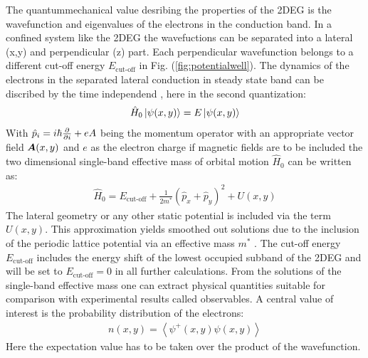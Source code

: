 The quantummechanical value desribing the properties of the 2DEG is the wavefunction and eigenvalues of the electrons in the conduction band. In a confined system like the 2DEG the wavefuctions can be separated into a lateral (x,y) and perpendicular (z) part. Each perpendicular wavefunction belongs to a different cut-off energy $E_{\text{cut-off}}$ in Fig. (\ref{fig:potentialwell}).
The dynamics of the electrons in the separated lateral conduction in steady state band can be discribed by the time independend \sdg{}, here in the second quantization:
\begin{align}
 \hat{H}_0\left| \psi(x,y) \right> = E \left| \psi(x,y) \right>
	\label{eqn:effectivemasssdg}
\end{align}
With $\hat{p}_i = i\hbar \frac{\partial }{\partial i} + eA$ being the momentum operator with an appropriate vector field $\boldsymbol{A}(x,y)$ and $e$ as the electron charge if magnetic fields are to be included the two dimensional single-band effective mass \hamil{} of orbital motion $\hat{H}_0$ can be written as:
\begin{align}
\hat{H}_0 = E_{\text{cut-off}} + \frac{1}{2m^*}(\hat{p}_{x}+\hat{p}_{y})^2+U(x,y)
\end{align}
The lateral geometry or any other static potential is included via the term $U(x,y)$.
This approximation yields smoothed out solutions due to the inclusion of the periodic lattice potential via an effective mass $m^*$ \cite{BastardBrum1986}.
The cut-off energy $E_{\text{cut-off}}$ includes the energy shift of the lowest occupied subband of the 2DEG and will be set to $E_{\text{cut-off}} = 0$ in all further calculations.
From the solutions of the single-band effective mass \sdg{} one can extract physical quantities suitable for comparison with experimental results called observables.
A central value of interest is the probability distribution of the electrons:
\begin{align}
	n(x,y) = \left< \psi^+ (x,y) \psi(x,y)\right>
	\label{eqn:analyticalelectrondensity}
\end{align}
Here the expectation value has to be taken over the product of the wavefunction.
